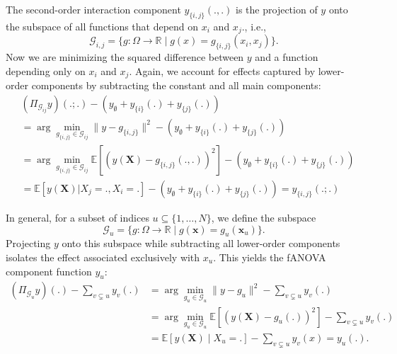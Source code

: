 The second-order interaction component $y_{\{i,j\}}(.,.)$ is the projection of $y$ onto the subspace of all functions that depend on $x_i$ and $x_j$., i.e.,
$$\mathcal{G}_{i,j} = \{ g : \Omega \to \mathbb{R} \mid g(x) = g_{\{i,j\}}(x_i, x_j)\}.$$
Now we are minimizing the squared difference between $y$ and a function depending only on $x_i$ and $x_j$. Again, we account for effects captured by lower-order components by subtracting the constant and all main components:
\begin{align*}
    &(\Pi_{\mathcal{G}_{ij}}y)(.;.) - (y_{\emptyset} + y_{\{i\}}(.) + y_{\{j\}}(.)) \\
    &= \arg \min_{g_{\{i,j\}} \in \mathcal{G}_{ij}} \|y - g_{\{i,j\}}\|^2 - (y_{\emptyset} + y_{\{i\}}(.) + y_{\{j\}}(.))\\
    &= \arg \min_{g_{\{i,j\}} \in \mathcal{G}_{ij}} \mathbb{E}[(y(\boldsymbol{X}) - g_{\{i,j\}}(., .))^2] - (y_{\emptyset} + y_{\{i\}}(.) + y_{\{j\}}(.))\\
    &= \mathbb{E}[y(\boldsymbol{X}) | X_j = ., X_i = .] - (y_{\emptyset} + y_{\{i\}}(.) + y_{\{j\}}(.)) = y_{\{i,j\}}(.;.)
\end{align*}

In general, for a subset of indices $u \subseteq \{1, \dots, N\}$, we define the subspace
\[
\mathcal{G}_u = \{ g : \Omega \to \mathbb{R} \mid g(\boldsymbol{x}) = g_u(\boldsymbol{x}_u)\}.
\]
Projecting $y$ onto this subspace while subtracting all lower-order components 
isolates the effect associated exclusively with $x_u$. This yields the fANOVA component function $y_u$:
\begin{align*}
    (\Pi_{\mathcal{G}_u}y)(.) - \sum_{v \subsetneq u} y_v(.)
    &= \arg \min_{g_u \in \mathcal{G}_u} \|y - g_u\|^2 - \sum_{v \subsetneq u} y_v(.)\\
    &= \arg \min_{g_u \in \mathcal{G}_{u}} \mathbb{E}[(y(\boldsymbol{X}) - g_u(.))^2] - \sum_{v \subsetneq u} y_v(.)\\
    &= \mathbb{E}[y(\boldsymbol{X}) \mid X_{u} = .] - \sum_{v \subsetneq u} y_v(x) = y_u(.).
\end{align*}

